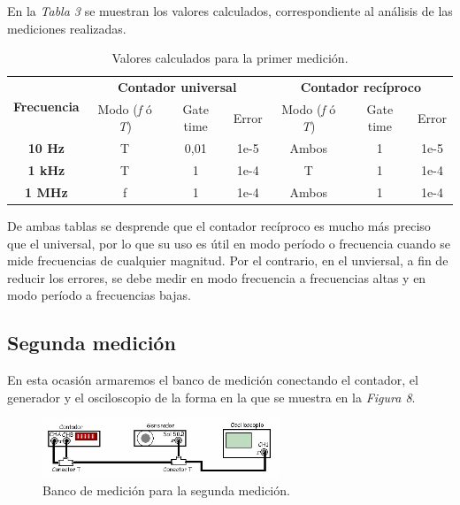 \documentclass{article}
\begin{document}
	En la \textit{Tabla 3} se muestran los valores calculados, correspondiente al análisis de las mediciones realizadas.
\bigskip\bigskip

\begin{table}[!hbt]
	\begin{center}

		\begin{tabular}{|c|c|c|c|c|c|c|} \hline
			\multirow{2}{*}{\textbf{Frecuencia}}
			& \multicolumn{3}{c|}{\textbf{Contador universal}} & \multicolumn{3}{c|}{\textbf{Contador recíproco}} \\\cline{2-7}
			& Modo (\textit{f} ó \textit{T}) & Gate time & Error & Modo (\textit{f} ó \textit{T}) & Gate time & Error \\\hline
			
			\textbf{10 Hz} & T & 0,01 & 1e-5 & Ambos & 1 & 1e-5 \\\hline
			\textbf{1 kHz} & T & 1 & 1e-4 & T & 1 & 1e-4 \\\hline
			\textbf{1 MHz} & f & 1 & 1e-4 & Ambos & 1 & 1e-4 \\\hline
		\end{tabular}

	\caption{Valores calculados para la primer medición.}
	\end{center}
\end{table}
\medskip\medskip

		
		De ambas tablas se desprende que el contador recíproco es mucho más preciso que el universal, por lo que su uso es útil en modo período o frecuencia cuando se mide frecuencias de cualquier magnitud. Por el contrario, en el unviersal, a fin de reducir los errores, se debe medir en modo frecuencia a frecuencias altas y en modo período a frecuencias bajas.


\newpage
\subsection{Segunda medición}
\medskip

	En esta ocasión armaremos el banco de medición conectando el contador, el generador y el osciloscopio de la forma en la que se muestra en la \textit{Figura 8}.
\bigskip


\begin{figure}[h]
	\centering
	\includegraphics[width=0.63\textwidth]{images/08-bancoMedicionMed2.jpg}
	\medskip
	\caption{Banco de medición para la segunda medición.}
\end{figure}
\bigskip\bigskip	
\end{document}
